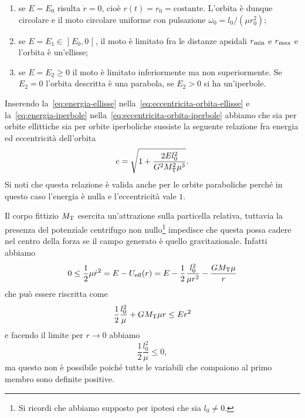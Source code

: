 {\begin{enumerate}
\item se $E = E_0$ risulta $\dot{r}=0$, cioè $r(t) = r_0 =
  \text{costante}$. L'orbita è dunque circolare e il moto circolare uniforme con
  pulsazione $\omega_0 = l_0/(\mu r_0^2)$;
\item se $E = E_1 \in \mathopen{]}E_0,0\mathclose{[}$, il moto è limitato fra le
  distanze apsidali $r_\textup{min}$ e $r_\textup{max}$ e l'orbita è un'ellisse;
\item se $E = E_2 \geq 0$ il moto è limitato inferiormente ma non
  superiormente. Se $E_2 = 0$ l'orbita descritta è una parabola, se $E_2>0$ si
  ha un'iperbole.
\end{enumerate}

Inserendo la~\eqref{eq:energia-ellisse}
nella~\eqref{eq:eccentricita-orbita-ellisse} e la~\eqref{eq:energia-iperbole}
nella~\eqref{eq:eccentricita-orbita-iperbole} abbiamo che sia per orbite
ellittiche sia per orbite iperboliche sussiste la seguente relazione fra energia
ed eccentricità dell'orbita
\begin{equation}
  \label{eq:eccentricita-energia}
  e = \sqrt{1+\frac{2El_0^2}{G^2M_\textup{T}^2\mu^3}}.
\end{equation}
Si noti che questa relazione è valida anche per le orbite paraboliche perché in
questo caso l'energia è nulla e l'eccentricità vale $1$.

Il corpo fittizio $M_\textup{T}$ esercita un'attrazione sulla particella
relativa, tuttavia la presenza del potenziale centrifugo non
nullo\footnote{Si ricordi che abbiamo supposto per ipotesi che sia $l_0\neq 0$.}
impedisce che questa possa cadere nel centro della forza se il campo generato è
quello gravitazionale. Infatti abbiamo
\begin{equation}
  0\leq \frac{1}{2}\mu\dot{r}^2 = E - U_\textup{eff}(r) = E -
  \frac{1}{2}\frac{l_0^2}{\mu r^2} - \frac{GM_\textup{T}\mu}{r}
\end{equation}
che può essere riscritta come
\begin{equation}
  \frac{1}{2}\frac{l_0^2}{\mu} + GM_\textup{T}\mu r \leq Er^2
\end{equation}
e facendo il limite per $r \to 0$ abbiamo
\begin{equation}
  \frac{1}{2}\frac{l_0^2}{\mu} \leq 0,
\end{equation}
ma questo non è possibile poiché tutte le variabili che compaiono al primo
membro sono definite positive.

}
